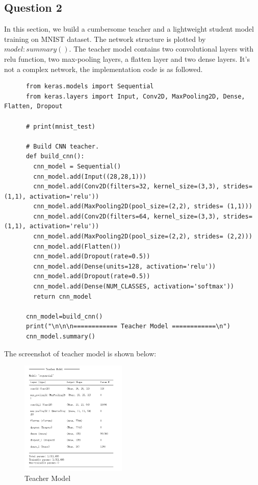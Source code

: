 \documentclass[conference]{IEEEtran}
\begin{document}
  \subsection{Question 2}
  In this section, we build a cumbersome teacher and a lightweight student model training on MNIST dataset. The network structure is plotted by $model:summary()$.
  The teacher model contains two convolutional layers with relu function, two max-pooling layers, a flatten layer and two dense layers. It's not a complex network, the implementation code is as followed.
  \begin{lstlisting}
      from keras.models import Sequential
      from keras.layers import Input, Conv2D, MaxPooling2D, Dense, Flatten, Dropout
      
      # print(mnist_test)
      
      # Build CNN teacher.
      def build_cnn():
        cnn_model = Sequential()
        cnn_model.add(Input((28,28,1)))
        cnn_model.add(Conv2D(filters=32, kernel_size=(3,3), strides= (1,1), activation='relu'))
        cnn_model.add(MaxPooling2D(pool_size=(2,2), strides= (1,1)))
        cnn_model.add(Conv2D(filters=64, kernel_size=(3,3), strides= (1,1), activation='relu'))
        cnn_model.add(MaxPooling2D(pool_size=(2,2), strides= (2,2)))
        cnn_model.add(Flatten())
        cnn_model.add(Dropout(rate=0.5))
        cnn_model.add(Dense(units=128, activation='relu'))
        cnn_model.add(Dropout(rate=0.5))
        cnn_model.add(Dense(NUM_CLASSES, activation='softmax'))
        return cnn_model
      
      cnn_model=build_cnn()
      print("\n\n\n============ Teacher Model ============\n")
      cnn_model.summary()
  \end{lstlisting} \par
  The screenshot of teacher model is shown below:
  \begin{figure}[h] 
      \centering
      \includegraphics[width=0.45\textwidth]{./graphs/Teacher_MNIST.png}
      \caption{Teacher Model}
      \label{Fig.t1q3e}
  \end{figure}
\end{document}
